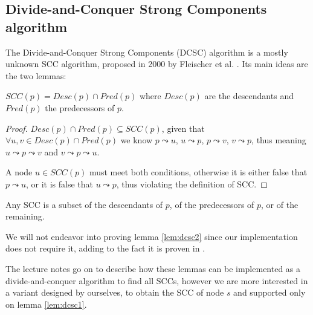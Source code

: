 \subsection[DCSC algorithm]{Divide-and-Conquer Strong Components algorithm} \label{algorithm-scc-dcsc}
The Divide-and-Conquer Strong Components (DCSC) algorithm is a mostly unknown SCC algorithm, proposed in 2000 by Fleischer et al. \cite{fleischer-dcsc}. Its main ideas are the two lemmas:
\begin{lemma} \label{lem:dcsc1}
    $SCC(p)=Desc(p) \cap Pred(p)$ where $Desc(p)$ are the descendants and $Pred(p)$ the predecessors of $p$.
\end{lemma}
\begin{proof}
    $Desc(p) \cap Pred(p) \subseteq SCC(p)$, given that $\forall u, v \in Desc(p) \cap Pred(p)$ we know $p \leadsto u$, $u \leadsto p$, $p \leadsto v$, $v \leadsto p$, thus meaning $u \leadsto p \leadsto v$ and $v \leadsto p \leadsto u$.\par
    A node $u \in SCC(p)$ must meet both conditions, otherwise it is either false that $p \leadsto u$, or it is false that $u \leadsto p$, thus violating the definition of SCC.
\end{proof}
\begin{lemma} \label{lem:dcsc2}
    Any SCC is a subset of the descendants of $p$, of the predecessors of $p$, or of the remaining.
\end{lemma}
We will not endeavor into proving lemma \ref{lem:dcsc2} since our implementation does not require it, adding to the fact it is proven in \cite{fleischer-dcsc}.\par
The lecture notes go on to describe how these lemmas can be implemented as a divide-and-conquer algorithm to find all SCCs, however we are more interested in a variant designed by ourselves, to obtain the SCC of node $s$ and supported only on lemma \ref{lem:dcsc1}.
